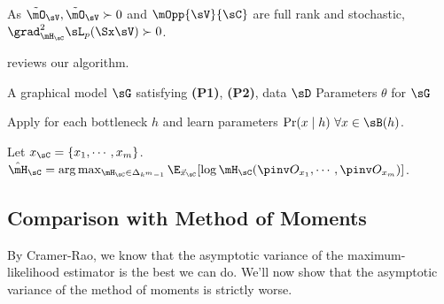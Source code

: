 As $\tilde \mO_\sV, \tilde \mO_\sV \succ 0$ and $\mOpp{\sV}{\sC}$ are
full rank and stochastic, $\grad^2_{\mH_\sC} \sL_p(\Sx \sV) \succ 0$.

 reviews our algorithm.

\begin{algorithm}
  \caption{\LearnPiecewise}
  \label{algo:piecewise}
  \begin{algorithmic}
    \REQUIRE A graphical model $\sG$ satisfying \textbf{(P1)}, \textbf{(P2)}, data $\sD$
    \ENSURE Parameters $\theta$ for $\sG$

        \STATE Apply \TensorFactorize for each bottleneck $h$ and learn parameters $\Pr(x \mid h) ~ \forall x \in \sB(h)$.

      \ENDFOR
      \STATE Let $x_\sC = \{x_1, \cdots, x_m\}$.
      \STATE $\hat \mH_\sC = \arg\max_{\mH_\sC \in \Delta_{k^m-1}} \E_{\vec x_\sC}[ \log \mH_\sC( \pinv O_{x_1}, \cdots, \pinv O_{x_m} ) ]$.
      \ENDFOR
  \end{algorithmic}
\end{algorithm}

\subsection{Comparison with Method of Moments}

By Cramer-Rao, we know that the asymptotic variance of the
  maximum-likelihood estimator is the best we can do.
We'll now show that the asymptotic variance of the method of moments is strictly worse.

